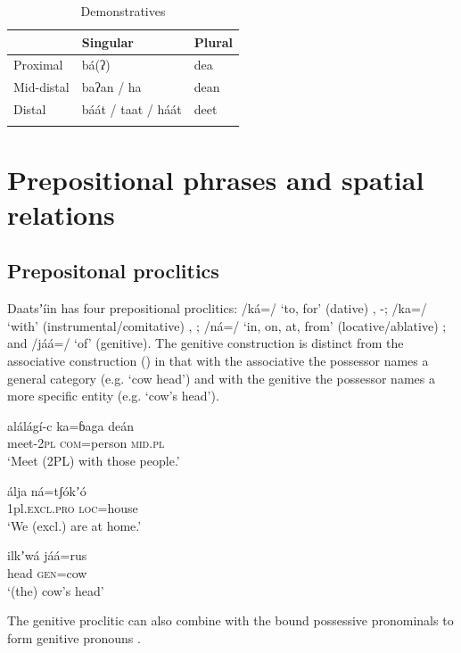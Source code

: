 \documentclass[output=paper]{langsci/langscibook}
\begin{document}
\begin{table}
\begin{tabularx}{\textwidth}{XXX} 
\lsptoprule & Singular &  Plural\\
\midrule
 Proximal &  bá(ʔ) & dea\\
 Mid-distal & baʔan / ha &  dean\\
Distal & báát / taat / háát & deet\\
\lspbottomrule
\end{tabularx}
\caption{Demonstratives}
\label{tab:ahlandc:11}
\end{table}

\section{Prepositional phrases and spatial relations}\label{sec:ahlandc:10}

\subsection{Prepositonal proclitics}\label{sec:ahlandc:10.1}

Daatsʼíin has four prepositional proclitics: /ká=/ ‘to, for’ (dative) , -; /ka=/ ‘with’ (instrumental/comitative) , ; /n\'{a}=/ ‘in, on, at, from’ (locative/ablative) ; and /jáá=/ ‘of’ (genitive).  The genitive construction  is distinct from the associative construction () in that with the associative the possessor names a general category (e.g. ‘cow head’) and with the genitive the possessor names a more specific entity (e.g. ‘cow’s head’).

\ea\label{ex:ahlandc:56}
\gll
alálágí-c  ka=ɓaga  deán    \\
meet-\textsc{2pl}   \textsc{com}=person  \textsc{mid.pl} \\
\glt
‘Meet (2PL) with those people.’
\z

\ea\label{ex:ahlandc:57}
\gll
álja  ná=tʃ\'{o}kʼ\'{o} \\
1pl\textsc{.excl.pro}   \textsc{loc}=house \\
\glt
‘We (excl.) are at home.’
\z

\ea\label{ex:ahlandc:58}
\gll
ilkʼwá  jáá=rus \\
head   \textsc{gen}=cow \\
\glt
‘(the) cow’s head’
\z

The genitive proclitic can also combine with the bound possessive pronominals to form genitive pronouns .
\end{document}
